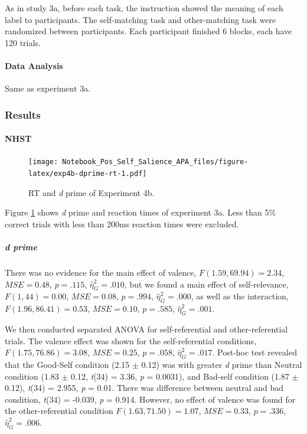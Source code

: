 \documentclass[
  english,
  man]{apa6}
\let\oldparagraph\paragraph
\renewcommand{\paragraph}[1]{\oldparagraph{#1}\mbox{}}
\let\oldsubparagraph\subparagraph
\renewcommand{\subparagraph}[1]{\oldsubparagraph{#1}\mbox{}}
\begin{document}
As in study 3a, before each task, the instruction showed the meaning of each label to participants. The self-matching task and other-matching task were randomized between participants. Each participant finished 6 blocks, each have 120 trials.

\hypertarget{data-analysis-10}{%
\paragraph{Data Analysis}\label{data-analysis-10}}

Same as experiment 3a.

\hypertarget{results-8}{%
\subsubsection{Results}\label{results-8}}

\hypertarget{nhst-7}{%
\paragraph{NHST}\label{nhst-7}}

\begin{figure}
\centering
\texttt{[image: Notebook\_Pos\_Self\_Salience\_APA\_files/figure-latex/exp4b-dprime-rt-1.pdf]}
\caption{\label{fig:exp4b-dprime-rt}RT and \emph{d} prime of Experiment 4b.}
\end{figure}

Figure \ref{fig:exp4b-dprime-rt} shows \emph{d} prime and reaction times of experiment 3a. Less than 5\% correct trials with less than 200ms reaction times were excluded.

\hypertarget{d-prime-7}{%
\subparagraph{d prime}\label{d-prime-7}}

There was no evidence for the main effect of valence, \(F(1.59, 69.94) = 2.34\), \(\mathit{MSE} = 0.48\), \(p = .115\), \(\hat{\eta}^2_G = .010\), but we found a main effect of self-relevance, \(F(1, 44) = 0.00\), \(\mathit{MSE} = 0.08\), \(p = .994\), \(\hat{\eta}^2_G = .000\), as well as the interaction, \(F(1.96, 86.41) = 0.53\), \(\mathit{MSE} = 0.10\), \(p = .585\), \(\hat{\eta}^2_G = .001\).

We then conducted separated ANOVA for self-referential and other-referential trials. The valence effect was shown for the self-referential conditions, \(F(1.75, 76.86) = 3.08\), \(\mathit{MSE} = 0.25\), \(p = .058\), \(\hat{\eta}^2_G = .017\). Post-hoc test revealed that the Good-Self condition (2.15 \(\pm\) 0.12) was with greater \emph{d} prime than Neutral condition (1.83 \(\pm\) 0.12, \emph{t}(34) = 3.36, \emph{p} = 0.0031), and Bad-self condition (1.87 \(\pm\) 0.12), \emph{t}(34) = 2.955, \emph{p} = 0.01. There was difference between neutral and bad condition, \emph{t}(34) = -0.039, \emph{p} = 0.914. However, no effect of valence was found for the other-referential condition \(F(1.63, 71.50) = 1.07\), \(\mathit{MSE} = 0.33\), \(p = .336\), \(\hat{\eta}^2_G = .006\).
\end{document}
